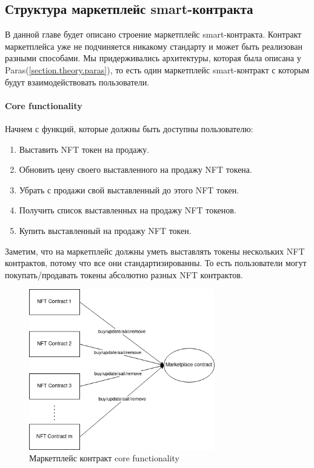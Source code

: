 \subsection{Структура маркетплейс smart-контракта}

В данной главе будет описано строение маркетплейс smart-контракта. Контракт маркетплейса уже не подчиняется никакому стандарту и может быть реализован разными способами.
Мы придерживались архитектуры, которая была описана у Paras({\color{blue}\ref{section.theory.paras}}), то есть один маркетплейс smart-контракт с которым будут взаимодействовать пользователи.

\paragraph{Core functionality}

Начнем с функций, которые должны быть доступны пользователю:
\begin{enumerate}
    \item Выставить NFT токен на продажу.
    \item Обновить цену своего выставленного на продажу NFT токена.
    \item Убрать с продажи свой выставленный до этого NFT токен.
    \item Получить список выставленных на продажу NFT токенов.
    \item Купить выставленный на продажу NFT токен.
\end{enumerate}

Заметим, что на маркетплейс должны уметь выставлять токены нескольких NFT контрактов, потому что все они стандартизированны.
То есть пользователи могут покупать/продавать токены абсолютно разных NFT контрактов.

\begin{figure}[h!]
	\centering
	\includegraphics[height=70mm]{fig/marketplace.png}
	\caption{Маркетплейс контракт core functionality}
\end{figure}

